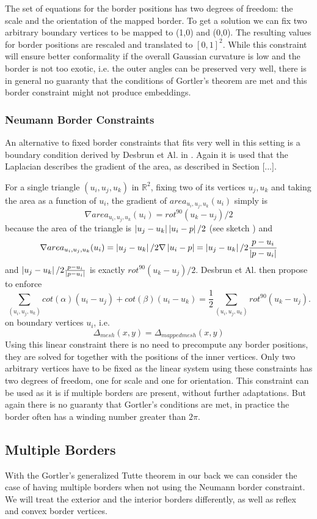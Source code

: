 The set of equations for the border positions has two degrees of freedom: the scale and the orientation  of the mapped border. To get a solution we can fix two arbitrary boundary vertices to be mapped to  (1,0) and (0,0). The resulting values for border positions are rescaled and translated to $[0,1]^2$. While this constraint will ensure better conformality if the overall Gaussian curvature is low and the border is not too exotic, i.e. the outer angles can be preserved very well, there is in general no guaranty that the conditions of Gortler's theorem are met and this border constraint might not produce embeddings.

\subsubsection{Neumann Border Constraints}
An alternative to fixed border constraints that fits very well in this setting is a boundary condition derived by Desbrun et Al. in . Again it is used that the Laplacian describes the gradient of the area, as described in Section [...]. 

For a single triangle $(u_i,u_j,u_k)$ in $\mathbb R^2$, fixing two of its vertices $u_j, u_k$ and taking the area as a function of $u_i$, the gradient of $area_{u_i,u_j,u_k}(u_i)$ simply is
\[ \nabla area_{u_i,u_j,u_k}(u_i) = rot^{90}(u_k-u_j)/2\]
because the area of the triangle is $\left| u_j-u_k \right|\left| u_i-p \right|/2$ (see sketch ) and
\[ \nabla area_{u_i,u_j,u_k}(u_i) = \left| u_j-u_k \right|/2  \nabla \left| u_i-p \right|= \left| u_j-u_k \right|/2 \frac{p-u_i}{\left| p-u_i \right|}\]
and $\left| u_j-u_k \right|/2 \frac{p-u_i}{\left| p-u_i \right|}$ is exactly $rot^{90}(u_k-u_j)/2$. Desbrun et Al. then propose to enforce
\[\sum_{(u_i,u_j,u_k)}cot(\alpha) (u_i-u_j) + cot(\beta) (u_i - u_k) = \frac{1}{2}\sum_{(u_i,u_j,u_k)}rot^{90}(u_k-u_j).\]
on boundary vertices $u_i$, i.e.
\[\Delta_{mesh} (x,y) = \Delta_{mappedmesh}(x,y)\]
Using this linear constraint there is no need to precompute any border positions, they are solved for together with the positions of the inner vertices. Only two arbitrary vertices have to be fixed as the linear system using these constraints has two degrees of freedom, one for scale and one for orientation. This constraint can be used as it is if multiple borders are present, without further adaptations. But again there is no guaranty that Gortler's conditions are met, in practice the border often has a winding number greater than $2\pi$.


\subsection{Multiple Borders}
With the Gortler's generalized Tutte theorem in our back we can consider the case of having multiple borders when not using the Neumann border constraint. We will treat the exterior and the interior borders differently, as well as reflex and convex border vertices. 
